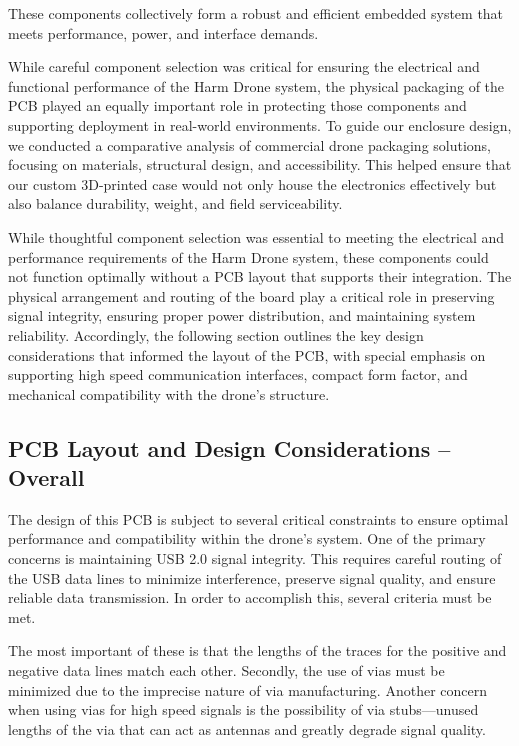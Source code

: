 \documentclass[12pt]{article}
\begin{document}
\par These components collectively form a robust and efficient embedded system that meets performance, power, and interface demands.
\par While careful component selection was critical for ensuring the electrical and functional performance of the Harm Drone system, the physical packaging of the PCB played an equally important role in protecting those components and supporting deployment in real-world environments. To guide our enclosure design, we conducted a comparative analysis of commercial drone packaging solutions, focusing on materials, structural design, and accessibility. This helped ensure that our custom 3D-printed case would not only house the electronics effectively but also balance durability, weight, and field serviceability.
\par While thoughtful component selection was essential to meeting the electrical and performance requirements of the Harm Drone system, these components could not function optimally without a PCB layout that supports their integration. The physical arrangement and routing of the board play a critical role in preserving signal integrity, ensuring proper power distribution, and maintaining system reliability. Accordingly, the following section outlines the key design considerations that informed the layout of the PCB, with special emphasis on supporting high speed communication interfaces, compact form factor, and mechanical compatibility with the drone's structure.
\subsection{PCB Layout and Design Considerations – Overall}
The design of this PCB is subject to several critical constraints to ensure optimal performance and compatibility within the drone’s system. One of the primary concerns is maintaining USB 2.0 signal integrity. This requires careful routing of the USB data lines to minimize interference, preserve signal quality, and ensure reliable data transmission. In order to accomplish this, several criteria must be met. 

\par The most important of these is that the lengths of the traces for the positive and negative data lines match each other. Secondly, the use of vias must be minimized due to the imprecise nature of via manufacturing. Another concern when using vias for high speed signals is the possibility of via stubs—unused lengths of the via that can act as antennas and greatly degrade signal quality.
\end{document}
